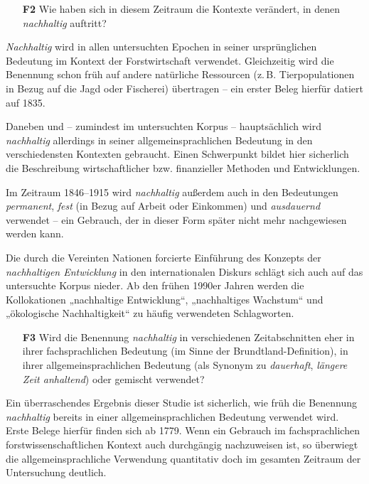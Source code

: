 \documentclass[
    german,
    a4paper,%
    12pt,%
    oneside,%
    toc=bibliography,
    final,
]{scrartcl}
\begin{document}
\begin{enumerate}[rightmargin=1cm]
\item[\textbf{F2}] Wie haben sich in diesem Zeitraum die Kontexte verändert, in denen \textit{nachhaltig} auftritt?
\end{enumerate}

\textit{Nachhaltig} wird in allen untersuchten Epochen in seiner ursprünglichen Bedeutung im Kontext der Forstwirtschaft verwendet. Gleichzeitig wird die Benennung schon früh auf andere natürliche Ressourcen (z.\,B. Tierpopulationen in Bezug auf die Jagd oder Fischerei) übertragen – ein erster Beleg hierfür datiert auf 1835.

Daneben und – zumindest im untersuchten Korpus – hauptsächlich wird \textit{nachhaltig} allerdings in seiner allgemeinsprachlichen Bedeutung in den verschiedensten Kontexten gebraucht. Einen Schwerpunkt bildet hier sicherlich die Beschreibung wirtschaftlicher bzw. finanzieller Methoden und Entwicklungen.

Im Zeitraum 1846–1915 wird \textit{nachhaltig} außerdem auch in den Bedeutungen \textit{permanent}, \textit{fest} (in Bezug auf Arbeit oder Einkommen) und \textit{ausdauernd} verwendet – ein Gebrauch, der in dieser Form später nicht mehr nachgewiesen werden kann.

Die durch die Vereinten Nationen forcierte Einführung des Konzepts der \textit{nachhaltigen Entwicklung} in den internationalen Diskurs schlägt sich auch auf das untersuchte Korpus nieder. Ab den frühen 1990er Jahren werden die Kollokationen „nachhaltige Entwicklung“, „nachhaltiges Wachstum“ und „ökologische Nachhaltigkeit“ zu häufig verwendeten Schlagworten.

\begin{enumerate}[rightmargin=1cm]
\item[\textbf{F3}] Wird die Benennung \textit{nachhaltig} in verschiedenen Zeitabschnitten eher in ihrer fachsprachlichen Bedeutung (im Sinne der Brundtland-Definition), in ihrer allgemeinsprachlichen Bedeutung (als Synonym zu \textit{dauerhaft}, \textit{längere Zeit anhaltend}) oder gemischt verwendet?
\end{enumerate}

Ein überraschendes Ergebnis dieser Studie ist sicherlich, wie früh die Benennung \textit{nachhaltig} bereits in einer allgemeinsprachlichen Bedeutung verwendet wird. Erste Belege hierfür finden sich ab 1779. Wenn ein Gebrauch im fachsprachlichen forstwissenschaftlichen Kontext auch durchgängig nachzuweisen ist, so überwiegt die allgemeinsprachliche Verwendung quantitativ doch im gesamten Zeitraum der Untersuchung deutlich.
\end{document}
